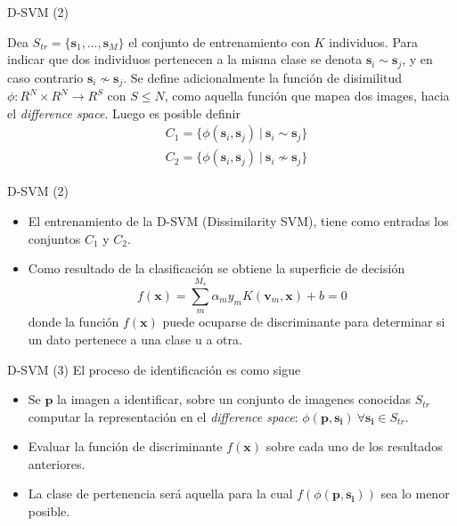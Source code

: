 \documentclass{beamer}
\begin{document}
\begin{frame}{D-SVM (2)}
\begin{definition}
 Dea $S_{tr} = \{\mathbf{s}_1 , \ldots, \mathbf{s}_M \}$ el conjunto de entrenamiento con $K$ individuos. Para indicar que dos individuos pertenecen a la misma clase se denota $\mathbf{s}_i \sim \mathbf{s}_j$, y en caso contrario $\mathbf{s}_i \nsim \mathbf{s}_j$. Se define adicionalmente la función de disimilitud $\phi : R^N \times R^N \rightarrow R^S$ con $S \leq N$, como aquella función que mapea dos images, hacia el \textit{difference space}. Luego es posible definir
\begin{align}
& C_1 = \{\phi(\mathbf{s}_i, \mathbf{s}_j)\  | \ \mathbf{s}_i \sim \mathbf{s}_j \} \\
& C_2 = \{\phi(\mathbf{s}_i, \mathbf{s}_j)\  | \ \mathbf{s}_i \nsim \mathbf{s}_j \}
\end{align}
\end{definition}
\end{frame}

\begin{frame}{D-SVM (2)}
\begin{itemize}
	\item El entrenamiento de la D-SVM (Dissimilarity SVM), tiene como entradas los conjuntos $C_1$ y $C_2$.
	\item Como resultado de la clasificación se obtiene la superficie de decisión 
$$
f(\mathbf{x}) = \sum_m^{M_s} \alpha_m y_m K(\mathbf{v}_m, \mathbf{x}) + b = 0
$$
	donde la función $f(\mathbf{x})$ puede ocuparse de discriminante para determinar si un dato pertenece a una clase u a otra.
\end{itemize}
\end{frame}
	
\begin{frame}{D-SVM (3)}
	El proceso de identificación es como sigue
\begin{itemize}
	\item Se $\mathbf{p}$ la imagen a identificar, sobre un conjunto de imagenes conocidas $S_{tr}$ computar la 
	representación en el \textit{difference space}: $\phi(\mathbf{p},\mathbf{s_i}) \ \forall \mathbf{s_i} \in S_{tr}$.
	\item Evaluar la función de discriminante $f(\mathbf{x})$ sobre cada uno de los resultados anteriores.
	\item La clase de pertenencia será aquella para la cual $f(\phi(\mathbf{p},\mathbf{s_i}))$ sea lo menor posible.
\end{itemize}
	
\end{frame}
\end{document}
